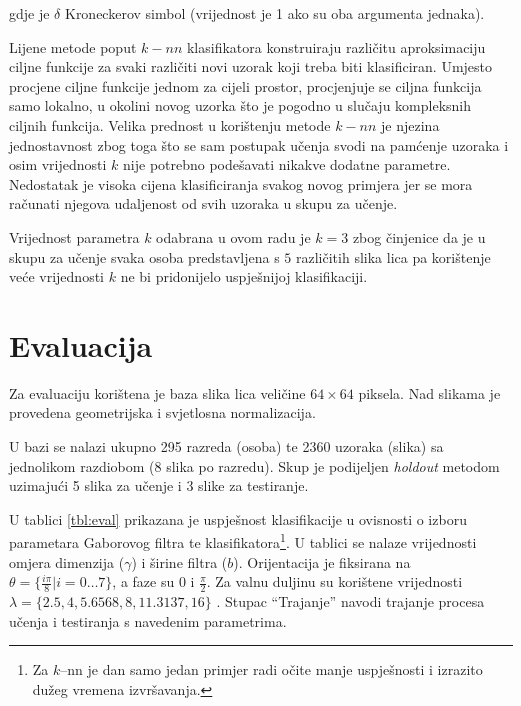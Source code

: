 \documentclass{ru}
\begin{document}
gdje je $\delta$ Kroneckerov simbol (vrijednost je 1 ako su oba argumenta jednaka).


Lijene metode poput $k-nn$ klasifikatora konstruiraju različitu aproksimaciju
ciljne funkcije za svaki različiti novi uzorak koji treba biti klasificiran. Umjesto
procjene ciljne funkcije jednom za cijeli prostor, procjenjuje se ciljna funkcija
samo lokalno, u okolini novog uzorka što je pogodno u slučaju kompleksnih ciljnih
funkcija. Velika prednost u korištenju metode $k-nn$ je njezina jednostavnost
zbog toga što se sam postupak učenja svodi na pamćenje uzoraka i osim vrijednosti
$k$ nije potrebno podešavati nikakve dodatne parametre. Nedostatak je visoka
cijena klasificiranja svakog novog primjera jer se mora računati njegova
udaljenost od svih uzoraka u skupu za učenje.

Vrijednost parametra $k$ odabrana u ovom radu je $k = 3$ zbog činjenice da je u
skupu za učenje svaka osoba predstavljena s $5$ različitih slika lica pa
korištenje veće vrijednosti $k$ ne bi pridonijelo uspješnijoj klasifikaciji.

\chapter{Evaluacija}
\label{ch:eval}
Za evaluaciju korištena je baza slika lica veličine $64 \times 64$ piksela. Nad
slikama je provedena geometrijska i svjetlosna normalizacija. 

U bazi se nalazi ukupno 295 razreda (osoba) te 2360 uzoraka (slika) sa
jednolikom razdiobom (8 slika po razredu). Skup je podijeljen \emph{holdout} metodom
uzimajući 5 slika za učenje i 3 slike za testiranje.

U tablici \ref{tbl:eval} prikazana je uspješnost klasifikacije u ovisnosti o izboru
parametara Gaborovog filtra te klasifikatora\footnote{Za $k$--nn je dan samo
jedan primjer radi očite manje uspješnosti i izrazito dužeg vremena
izvršavanja.}. U tablici se nalaze vrijednosti omjera dimenzija ($\gamma$) i širine filtra ($b$).
Orijentacija je fiksirana na $\theta = \{ \frac{i \pi}{8} | i =
0 \ldots 7\}$, a faze su $0$ i $\frac{\pi}{2}$. Za valnu duljinu su korištene
vrijednosti $\lambda = \{2.5, 4, 5.6568, 8, 11.3137, 16\}$
\citep{shen2007gabor}. Stupac ``Trajanje'' navodi trajanje procesa učenja i
testiranja s navedenim parametrima.
\end{document}
